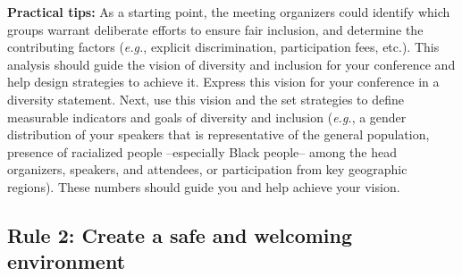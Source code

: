 \documentclass[10pt,letterpaper]{article}
\begin{document}
 \textbf{Practical tips:} As a starting point, the meeting organizers could identify which groups warrant deliberate efforts to ensure fair inclusion, and determine the contributing factors (\textit{e.g.}, explicit discrimination, participation fees, etc.).
This analysis should guide the vision of diversity and inclusion for your conference and help design strategies to achieve it. 
Express this vision for your conference in a diversity statement. 
Next, use this vision and the set strategies to define measurable indicators and goals of diversity and inclusion (\textit{e.g.}, a gender distribution of your speakers that is representative of the general population, presence of racialized people --especially Black people-- among the head organizers, speakers, and attendees, or participation from key geographic regions). 
These numbers should guide you and help achieve your vision.





\subsection*{Rule 2: Create a safe and welcoming environment}
\label{rule_inclusion}
\end{document}
